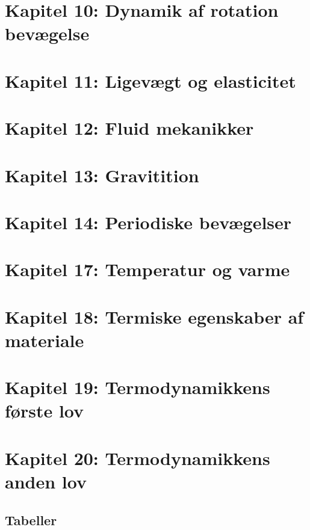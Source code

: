\documentclass{article}
\begin{document}
{	\section{Kapitel 10: Dynamik af rotation bevægelse}
	

	\section{Kapitel 11: Ligevægt og elasticitet}
	

	\section{Kapitel 12: Fluid mekanikker}
	

	\section{Kapitel 13: Gravitition}
	

	\section{Kapitel 14: Periodiske bevægelser}
	
	
	\section{Kapitel 17: Temperatur og varme}
	

	\section{Kapitel 18: Termiske egenskaber af materiale}
	

	\section{Kapitel 19: Termodynamikkens første lov}
	

	\section{Kapitel 20: Termodynamikkens anden lov}
	

	\subsection{Tabeller}
}
\end{document}
